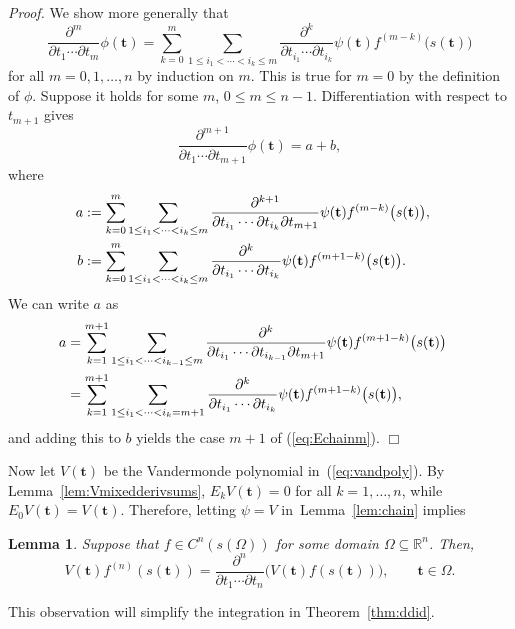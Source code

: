 \documentclass[12pt]{article}
\newcommand{\RR}{\mathbb{R}}
\def\bft{\mathbf{t}}
\newtheorem{lemma}{Lemma}
\newenvironment{proof}{\begin{trivlist}\item[]{\emph{Proof.}}}
               {\hfill$\Box$\end{trivlist}}
\begin{document}
\begin{proof}
We show more generally that
\begin{equation}\label{eq:Echainm}
\frac{\partial^m}{\partial t_1 \cdots \partial t_m} \phi(\bft)
= \sum_{k=0}^m
\sum_{1 \le i_1 < \cdots < i_k \le m}
\frac{\partial^k}{\partial t_{i_1} \cdots \partial t_{i_k}}
\psi(\bft) f^{(m-k)}\big(s(\bft)\big)
\end{equation}
for all $m=0,1,\ldots,n$ by induction on $m$.
This is true for $m=0$ by the definition of $\phi$.
Suppose it holds for some $m$, $0 \le m \le n-1$.
Differentiation with respect to $t_{m+1}$ gives
$$ 
\frac{\partial^{m+1}}{\partial t_1 \cdots \partial t_{m+1}} \phi(\bft)
   = a + b, $$
where
\begin{align*}
a &:= \sum_{k=0}^m 
\sum_{1 \le i_1 < \cdots < i_k \le m}
\frac{\partial^{k+1}}{\partial t_{i_1} \cdots \partial t_{i_k} \partial t_{m+1}}
\psi(\bft) f^{(m-k)}\big(s(\bft)\big), \cr
b &:= \sum_{k=0}^m 
\sum_{1 \le i_1 < \cdots < i_k \le m}
\frac{\partial^k}{\partial t_{i_1} \cdots \partial t_{i_k}}
\psi(\bft) f^{(m+1-k)}\big(s(\bft)\big).
\end{align*}
We can write $a$ as
\begin{align*}
a &= \sum_{k=1}^{m+1} 
\sum_{1 \le i_1 < \cdots < i_{k-1} \le m}
\frac{\partial^k}{\partial t_{i_1} \cdots \partial t_{i_{k-1}} \partial t_{m+1}}
\psi(\bft) f^{(m+1-k)}\big(s(\bft)\big) \cr
&= \sum_{k=1}^{m+1} 
\sum_{1 \le i_1 < \cdots < i_k = m+1}
\frac{\partial^k}{\partial t_{i_1} \cdots \partial t_{i_k}}
\psi(\bft) f^{(m+1-k)}\big(s(\bft)\big),
\end{align*}
and adding this to $b$ yields the case $m+1$ of (\ref{eq:Echainm}).
\end{proof}

Now let $V(\bft)$ be the Vandermonde polynomial in~(\ref{eq:vandpoly}).
By Lemma~\ref{lem:Vmixedderivsums},
$E_k V(\bft) = 0$ for all $k=1,\ldots,n$, while $E_0 V(\bft) = V(\bft)$.
Therefore, letting $\psi = V$ in~Lemma~\ref{lem:chain} implies

\begin{lemma}\label{lem:chainV}
Suppose that $f \in C^n(s(\Omega))$ for some domain $\Omega \subseteq \RR^n$.
Then,
$$ V(\bft) f^{(n)}(s(\bft)) =
\frac{\partial^n}{\partial t_1 \cdots \partial t_n}
\big(V(\bft) f(s(\bft))\big), \qquad \bft \in \Omega. $$
\end{lemma}
This observation will simplify the integration in Theorem~\ref{thm:ddid}.

\end{document}
